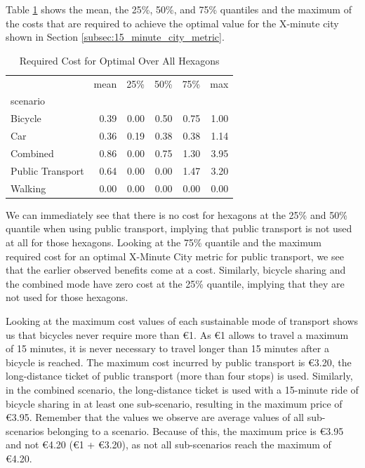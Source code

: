 Table \ref{tab:required_cost} shows the mean, the 25\%, 50\%, and 75\% quantiles and the maximum of the costs that are required to achieve the optimal value for the X-minute city shown in Section \ref{subsec:15_minute_city_metric}.
\begin{table}
  \caption{Required Cost for Optimal Over All Hexagons}
  \label{tab:required_cost}
  \begin{center}
    \begin{tabular}{lrrrrr}
     & mean & 25\% & 50\% & 75\% & max \\
    scenario &  &  &  &  &  \\
    Bicycle & 0.39 & 0.00 & 0.50 & 0.75 & 1.00 \\
    Car & 0.36 & 0.19 & 0.38 & 0.38 & 1.14 \\
    Combined & 0.86 & 0.00 & 0.75 & 1.30 & 3.95 \\
    Public Transport & 0.64 & 0.00 & 0.00 & 1.47 & 3.20 \\
    Walking & 0.00 & 0.00 & 0.00 & 0.00 & 0.00 \\
    \end{tabular}
  \end{center}
\end{table}
We can immediately see that there is no cost for hexagons at the 25\% and 50\% quantile when using public transport, implying that public transport is not used at all for those hexagons.
Looking at the 75\% quantile and the maximum required cost for an optimal X-Minute City metric for public transport, we see that the earlier observed benefits come at a cost.
Similarly, bicycle sharing and the combined mode have zero cost at the 25\% quantile, implying that they are not used for those hexagons.

Looking at the maximum cost values of each sustainable mode of transport shows us that bicycles never require more than \euro{1}.
As \euro{1} allows to travel a maximum of 15 minutes, it is never necessary to travel longer than 15 minutes after a bicycle is reached.
The maximum cost incurred by public transport is \euro{3.20}, the long-distance ticket of public transport (more than four stops) is used.
Similarly, in the combined scenario, the long-distance ticket is used with a 15-minute ride of bicycle sharing in at least one sub-scenario, resulting in the maximum price of \euro{3.95}.
Remember that the values we observe are average values of all sub-scenarios belonging to a scenario.
Because of this, the maximum price is \euro{3.95} and not \euro{4.20} (\euro{1} + \euro{3.20}), as not all sub-scenarios reach the maximum of \euro{4.20}.

